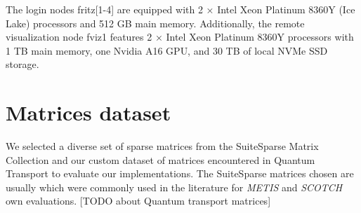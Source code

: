 The login nodes fritz[1-4] are equipped with 2 × Intel Xeon Platinum 8360Y (Ice Lake) processors and 512 GB main memory. Additionally, the remote visualization node fviz1 features 2 × Intel Xeon Platinum 8360Y processors with 1 TB main memory, one Nvidia A16 GPU, and 30 TB of local NVMe SSD storage.





\section{Matrices dataset}

We selected a diverse set of sparse matrices from the SuiteSparse Matrix Collection and our custom dataset of matrices encountered in Quantum Transport to evaluate our implementations. The SuiteSparse matrices chosen are usually which were commonly used in the literature for \textit{METIS} and \textit{SCOTCH} own evaluations. 
[TODO about Quantum transport matrices]

